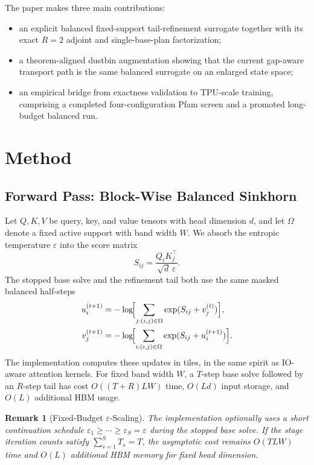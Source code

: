 \documentclass{article}
\newtheorem{remark}{Remark}
\begin{document}
The paper makes three main contributions:
\begin{itemize}
    \item an explicit balanced fixed-support tail-refinement surrogate together with its exact $R=2$ adjoint and single-base-plan factorization;
    \item a theorem-aligned dustbin augmentation showing that the current gap-aware transport path is the same balanced surrogate on an enlarged state space;
    \item an empirical bridge from exactness validation to TPU-scale training, comprising a completed four-configuration Pfam screen and a promoted long-budget balanced run.
\end{itemize}

\section{Method}

\subsection{Forward Pass: Block-Wise Balanced Sinkhorn}

Let $Q,K,V$ be query, key, and value tensors with head dimension $d$, and let $\Omega$ denote a fixed active support with band width $W$. We absorb the entropic temperature $\varepsilon$ into the score matrix
\[
S_{ij} = \frac{Q_i K_j^\top}{\sqrt{d}\,\varepsilon}.
\]
The stopped base solve and the refinement tail both use the same masked balanced half-steps
\begin{align}
    u_i^{(t+1)} &= -\log\!\Bigl[\sum_{j:(i,j)\in\Omega} \exp(S_{ij} + v_j^{(t)})\Bigr], \\
    v_j^{(t+1)} &= -\log\!\Bigl[\sum_{i:(i,j)\in\Omega} \exp(S_{ij} + u_i^{(t+1)})\Bigr].
\end{align}
The implementation computes these updates in tiles, in the same spirit as IO-aware attention kernels. For fixed band width $W$, a $T$-step base solve followed by an $R$-step tail has cost $O((T+R)LW)$ time, $O(Ld)$ input storage, and $O(L)$ additional HBM usage.

\begin{remark}[Fixed-Budget \texorpdfstring{$\varepsilon$}{epsilon}-Scaling]
The implementation optionally uses a short continuation schedule $\varepsilon_1 \ge \cdots \ge \varepsilon_S = \varepsilon$ during the stopped base solve. If the stage iteration counts satisfy $\sum_{s=1}^{S} T_s = T$, the asymptotic cost remains $O(TLW)$ time and $O(L)$ additional HBM memory for fixed head dimension.
\end{remark}
\end{document}

